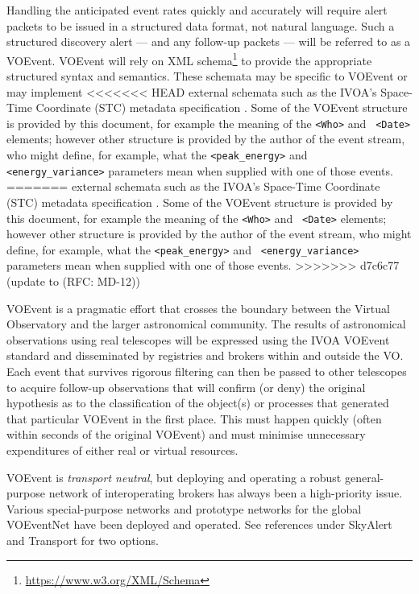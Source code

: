 \documentclass[11pt,a4paper]{ivoa}
\begin{document}
Handling the anticipated event rates quickly and accurately will require alert 
packets to be issued in a structured data format, not natural language. Such a 
structured discovery alert --- and any follow-up packets --- will be referred 
to as a VOEvent. VOEvent will rely on XML schema\footnote{
\url{https://www.w3.org/XML/Schema}} to provide the appropriate structured
syntax and semantics. These schemata may be specific to VOEvent or may implement
<<<<<<< HEAD
external schemata such as the IVOA's Space-Time Coordinate (STC) metadata
specification \citep{2007ivoa.spec.1030R}. Some of the VOEvent structure is
provided by this document, for example the meaning of the {\tt <Who>} and {\tt
<Date>} elements; however other structure is provided by the author of the event
stream, who might define, for example, what the {\tt <peak\_energy>} and {\tt
<energy\_variance>} parameters mean when supplied with one of those events.
=======
external schemata such as the IVOA's Space-Time Coordinate (STC) metadata 
specification \citep{2007ivoa.spec.1030R}. Some of the VOEvent structure is 
provided by this document, for example the meaning of the \texttt{<Who>} and \texttt{
<Date>} elements; however other structure is provided by the author of the event
stream, who might define, for example, what the \texttt{<peak\_energy>} and \texttt{
<energy\_variance>} parameters mean when supplied with one of those events. 
>>>>>>> d7c6c77 (update {\tt } to \texttt{} (RFC: MD-12))

VOEvent is a pragmatic effort that crosses the boundary between the Virtual
Observatory and the larger astronomical community. The results of astronomical
observations using real telescopes will be expressed using the IVOA VOEvent
standard and disseminated by registries and brokers within and outside the VO.
Each event that survives rigorous filtering can then be passed to other
telescopes to acquire follow-up observations that will confirm (or deny) the
original hypothesis as to the classification of the object(s) or processes that
generated that particular VOEvent in the first place. This must happen quickly
(often within seconds of the original VOEvent) and must minimise unnecessary
expenditures of either real or virtual resources.

VOEvent is \emph{transport neutral}, but deploying and operating a robust
general-purpose network of interoperating brokers has always been a
high-priority issue. Various special-purpose networks and prototype networks
for the global VOEventNet have been deployed and operated. See references under
SkyAlert \citep{bib05} and Transport \citep{bib33} for two options.
\end{document}
